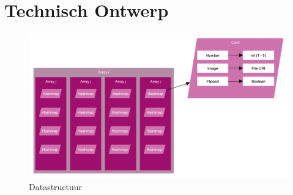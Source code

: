 \documentclass[a4paper,titlepage,11pt]{article}
\begin{document}
\clearpage

\section{Technisch Ontwerp}

\begin{figure}[!hb]
  \includegraphics[width=\linewidth]{../Images/datastructure.pdf}
  \caption{Datastructuur}\label{fig:datastructure}
\end{figure}
\end{document}
